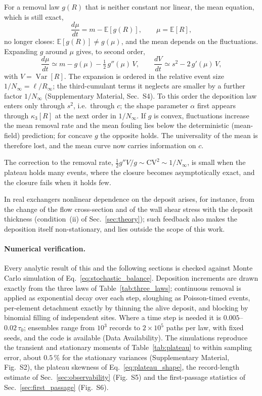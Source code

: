 \documentclass[preprint,12pt]{elsarticle}
\begin{document}
For a removal law $g(R)$ that is neither constant nor linear, the mean
equation, which is still exact,
\begin{equation}
  \frac{d\mu}{dt}=m-\mathbb E[g(R)],\qquad\mu=\mathbb E[R],
  \label{eq:nonlinear_mean}
\end{equation}
no longer closes: $\mathbb E[g(R)]\neq g(\mu)$, and the mean depends on the
fluctuations. Expanding $g$ around $\mu$ gives, to second order,
\begin{equation}
  \frac{d\mu}{dt}\simeq m-g(\mu)-\tfrac12\,g''(\mu)\,V,\qquad
  \frac{dV}{dt}\simeq s^2-2\,g'(\mu)\,V,
  \label{eq:nonlinear_moments}
\end{equation}
with $V=\operatorname{Var}[R]$. The expansion is ordered in the relative
event size $1/N_\infty=\ell/R_\infty$; the third-cumulant terms it neglects
are smaller by a further factor $1/N_\infty$ (Supplementary Material,
Sec.~S4). To this order the deposition law enters only through
$s^2$, i.e.\ through $c$; the shape parameter $\alpha$ first appears
through $\kappa_3[R]$ at the next order in $1/N_\infty$. If $g$
is convex, fluctuations increase the mean removal rate and the mean fouling
lies below the deterministic (mean-field) prediction; for concave $g$ the
opposite holds. The universality of the mean is therefore lost, and the mean
curve now carries information on $c$.

The correction to the removal rate, $\tfrac12g''V/g\sim\mathrm{CV}^2\sim1/N_\infty$,
is small when the plateau holds many events, where the closure becomes
asymptotically exact, and the closure fails when it holds few.

In real exchangers nonlinear dependence on the deposit
arises, for instance, from the change of the flow cross-section and of the
wall shear stress with the deposit thickness (condition~(ii) of Sec.~\ref{sec:theory}); such
feedback also makes the deposition itself non-stationary, and lies outside the
scope of this work.

\paragraph*{Numerical verification.}
Every analytic result of this and the following sections is checked against
Monte Carlo simulation of Eq.~\eqref{eq:stochastic_balance}. Deposition
increments are drawn exactly from the three laws of Table~\ref{tab:three_laws};
continuous removal is applied as exponential decay over each step, sloughing
as Poisson-timed events, per-element detachment exactly by thinning the alive
deposit, and blocking by binomial filling of independent sites. Where a time
step is needed it is $0.005$--$0.02\,\tau_0$; ensembles range from $10^3$
records to $2\times10^5$ paths per law, with fixed seeds, and the code is
available (Data Availability). The simulations reproduce the transient and
stationary moments of Table~\ref{tab:plateau} to within sampling error, about
$0.5\,\%$ for the stationary variances (Supplementary Material, Fig.~S2), the
plateau skewness of Eq.~\eqref{eq:plateau_shape}, the record-length estimate
of Sec.~\ref{sec:observability} (Fig.~S5) and the first-passage statistics of
Sec.~\ref{sec:first_passage} (Fig.~S6).
\end{document}
